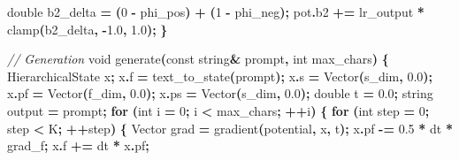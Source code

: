 \documentclass[
  11pt,
  a4paper,
]{article}
\newenvironment{Shaded}{\begin{snugshade}}{\end{snugshade}}
\newcommand{\AttributeTok}[1]{\textcolor[rgb]{0.13,0.29,0.53}{#1}}
\newcommand{\CommentTok}[1]{\textcolor[rgb]{0.56,0.35,0.01}{\textit{#1}}}
\newcommand{\ControlFlowTok}[1]{\textcolor[rgb]{0.13,0.29,0.53}{\textbf{#1}}}
\newcommand{\DataTypeTok}[1]{\textcolor[rgb]{0.13,0.29,0.53}{#1}}
\newcommand{\DecValTok}[1]{\textcolor[rgb]{0.00,0.00,0.81}{#1}}
\newcommand{\FloatTok}[1]{\textcolor[rgb]{0.00,0.00,0.81}{#1}}
\newcommand{\NormalTok}[1]{#1}
\newcommand{\OperatorTok}[1]{\textcolor[rgb]{0.81,0.36,0.00}{\textbf{#1}}}
\newcommand{\VariableTok}[1]{\textcolor[rgb]{0.00,0.00,0.00}{#1}}
\begin{document}
\begin{Shaded}
\begin{Highlighting}[]
    \DataTypeTok{double}\NormalTok{ b2\_delta }\OperatorTok{=} \OperatorTok{(}\DecValTok{0} \OperatorTok{{-}}\NormalTok{ phi\_pos}\OperatorTok{)} \OperatorTok{+} \OperatorTok{(}\DecValTok{1} \OperatorTok{{-}}\NormalTok{ phi\_neg}\OperatorTok{);}
\NormalTok{    pot}\OperatorTok{.}\NormalTok{b2 }\OperatorTok{+=}\NormalTok{ lr\_output }\OperatorTok{*}\NormalTok{ clamp}\OperatorTok{(}\NormalTok{b2\_delta}\OperatorTok{,} \OperatorTok{{-}}\FloatTok{1.0}\OperatorTok{,} \FloatTok{1.0}\OperatorTok{);}
\OperatorTok{\}}

\CommentTok{// Generation}
\DataTypeTok{void}\NormalTok{ generate}\OperatorTok{(}\AttributeTok{const}\NormalTok{ string}\OperatorTok{\&}\NormalTok{ prompt}\OperatorTok{,} \DataTypeTok{int}\NormalTok{ max\_chars}\OperatorTok{)} \OperatorTok{\{}
\NormalTok{    HierarchicalState x}\OperatorTok{;}
\NormalTok{    x}\OperatorTok{.}\NormalTok{f }\OperatorTok{=}\NormalTok{ text\_to\_state}\OperatorTok{(}\NormalTok{prompt}\OperatorTok{);}
\NormalTok{    x}\OperatorTok{.}\NormalTok{s }\OperatorTok{=}\NormalTok{ Vector}\OperatorTok{(}\VariableTok{s\_dim}\OperatorTok{,} \FloatTok{0.0}\OperatorTok{);}
\NormalTok{    x}\OperatorTok{.}\NormalTok{pf }\OperatorTok{=}\NormalTok{ Vector}\OperatorTok{(}\NormalTok{f\_dim}\OperatorTok{,} \FloatTok{0.0}\OperatorTok{);}
\NormalTok{    x}\OperatorTok{.}\NormalTok{ps }\OperatorTok{=}\NormalTok{ Vector}\OperatorTok{(}\VariableTok{s\_dim}\OperatorTok{,} \FloatTok{0.0}\OperatorTok{);}
    \DataTypeTok{double}\NormalTok{ t }\OperatorTok{=} \FloatTok{0.0}\OperatorTok{;}
\NormalTok{    string output }\OperatorTok{=}\NormalTok{ prompt}\OperatorTok{;}
    \ControlFlowTok{for} \OperatorTok{(}\DataTypeTok{int}\NormalTok{ i }\OperatorTok{=} \DecValTok{0}\OperatorTok{;}\NormalTok{ i }\OperatorTok{\textless{}}\NormalTok{ max\_chars}\OperatorTok{;} \OperatorTok{++}\NormalTok{i}\OperatorTok{)} \OperatorTok{\{}
        \ControlFlowTok{for} \OperatorTok{(}\DataTypeTok{int}\NormalTok{ step }\OperatorTok{=} \DecValTok{0}\OperatorTok{;}\NormalTok{ step }\OperatorTok{\textless{}}\NormalTok{ K}\OperatorTok{;} \OperatorTok{++}\NormalTok{step}\OperatorTok{)} \OperatorTok{\{}
\NormalTok{            Vector grad }\OperatorTok{=}\NormalTok{ gradient}\OperatorTok{(}\NormalTok{potential}\OperatorTok{,}\NormalTok{ x}\OperatorTok{,}\NormalTok{ t}\OperatorTok{);}
\NormalTok{            x}\OperatorTok{.}\NormalTok{pf }\OperatorTok{{-}=} \FloatTok{0.5} \OperatorTok{*}\NormalTok{ dt }\OperatorTok{*}\NormalTok{ grad\_f}\OperatorTok{;}
\NormalTok{            x}\OperatorTok{.}\NormalTok{f }\OperatorTok{+=}\NormalTok{ dt }\OperatorTok{*}\NormalTok{ x}\OperatorTok{.}\NormalTok{pf}\OperatorTok{;}

\end{Highlighting}
\end{Shaded}
\end{document}
